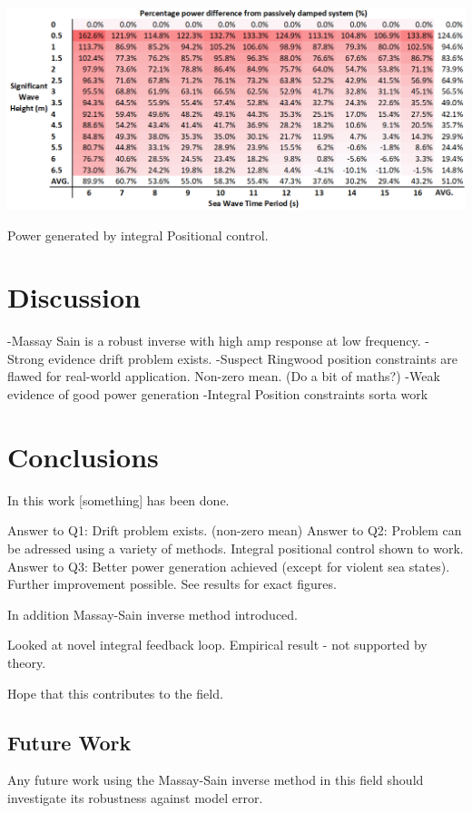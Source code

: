 \documentclass{report}
\begin{document}
\begin{table}
\hspace{-3cm}
\includegraphics[scale=0.7]{tables/integralControlPercent}
\caption{Power generated by integral Positional control.}
\end{table}

\chapter{Discussion}
-Massay Sain is a robust inverse with high amp response at low frequency.
-Strong evidence drift problem exists.
	-Suspect Ringwood position constraints are flawed for real-world application. Non-zero mean. (Do a bit of maths?)
-Weak evidence of good power generation
-Integral Position constraints sorta work

\chapter{Conclusions}
In this work [something] has been done.

Answer to Q1: Drift problem exists. (non-zero mean)
Answer to Q2: Problem can be adressed using a variety of methods. Integral positional control shown to work.
Answer to Q3: Better power generation achieved (except for violent sea states). Further improvement possible. See results for exact figures.

In addition Massay-Sain inverse method introduced.

Looked at novel integral feedback loop. Empirical result - not supported by theory.

Hope that this contributes to the field.

\section{Future Work}

Any future work using the Massay-Sain inverse method in this field should investigate its robustness against model error.
\end{document}
